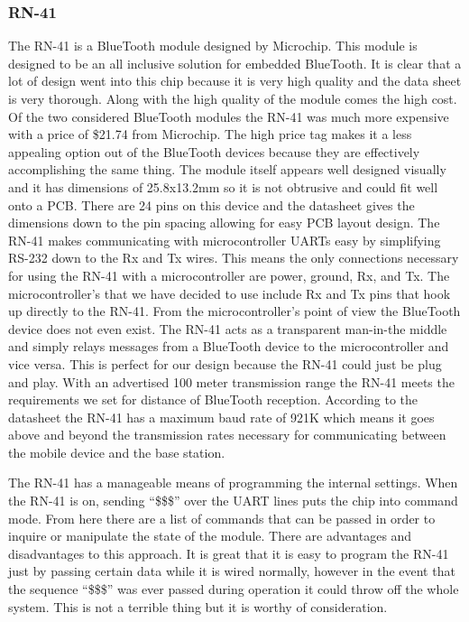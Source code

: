 \subsubsection{RN-41}
The RN{}-41 is a BlueTooth module designed by Microchip. This module is
designed to be an all inclusive solution for embedded BlueTooth. It is clear
that a lot of design went into this chip because it is very high quality and
the data sheet is very thorough. Along with the high quality of the module
comes the high cost. Of the two considered BlueTooth modules the RN{}-41 was
much more expensive with a price of \$21.74 from Microchip. The high price tag
makes it a less appealing option out of the BlueTooth devices because they are
effectively accomplishing the same thing. The module itself appears well
designed visually and it has dimensions of 25.8x13.2mm so it is not obtrusive
and could fit well onto a PCB. There are 24 pins on this device and the
datasheet gives the dimensions down to the pin spacing allowing for easy PCB
layout design. The RN{}-41 makes communicating with microcontroller UARTs easy
by simplifying RS{}-232 down to the Rx and Tx wires. This means the only
connections necessary for using the RN{}-41 with a microcontroller are power,
ground, Rx, and Tx. The microcontroller{}'s that we have decided to use include
Rx and Tx pins that hook up directly to the RN{}-41. From the
microcontroller{}'s point of view the BlueTooth device does not even exist. The
RN{}-41 acts as a transparent man{}-in{}-the middle and simply relays messages
from a BlueTooth device to the microcontroller and vice versa. This is perfect
for our design because the RN{}-41 could just be plug and play. With an
advertised 100 meter transmission range the RN{}-41 meets the requirements we
set for distance of BlueTooth reception.  According to the datasheet the
RN{}-41 has a maximum baud rate of 921K which means it goes above and beyond
the transmission rates necessary for communicating between the mobile device
and the base station.

The RN{}-41 has a manageable means of programming the internal settings. When
the RN{}-41 is on, sending {}``\$\$\$'' over the UART lines puts the chip into
command mode. From here there are a list of commands that can be passed in
order to inquire or manipulate the state of the module. There are advantages
and disadvantages to this approach. It is great that it is easy to program the
RN{}-41 just by passing certain data while it is wired normally, however in the
event that the sequence {}``\$\$\$'' was ever passed during operation it could
throw off the whole system. This is not a terrible thing but it is worthy of
consideration.

